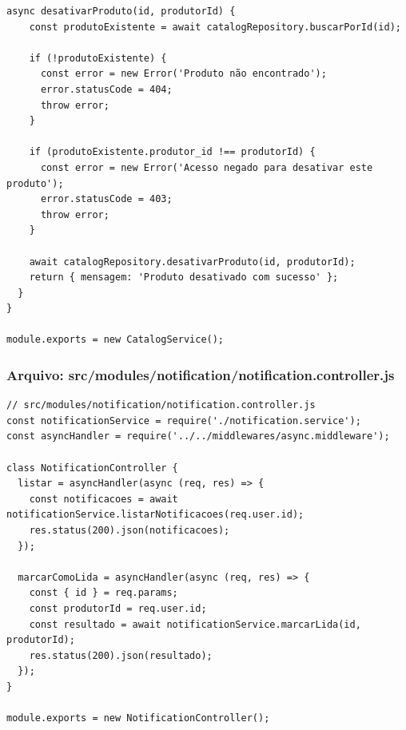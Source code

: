 \begin{lstlisting}[caption={src/modules/catalog/catalog.service.js}]
  async desativarProduto(id, produtorId) {
    const produtoExistente = await catalogRepository.buscarPorId(id);
    
    if (!produtoExistente) {
      const error = new Error('Produto não encontrado');
      error.statusCode = 404;
      throw error;
    }

    if (produtoExistente.produtor_id !== produtorId) {
      const error = new Error('Acesso negado para desativar este produto');
      error.statusCode = 403;
      throw error;
    }

    await catalogRepository.desativarProduto(id, produtorId);
    return { mensagem: 'Produto desativado com sucesso' };
  }
}

module.exports = new CatalogService();\end{lstlisting}
\vspace{0.5cm}
\subsubsection*{Arquivo: src/modules/notification/notification.controller.js}
\begin{lstlisting}[caption={src/modules/notification/notification.controller.js}]
// src/modules/notification/notification.controller.js
const notificationService = require('./notification.service');
const asyncHandler = require('../../middlewares/async.middleware');

class NotificationController {
  listar = asyncHandler(async (req, res) => {
    const notificacoes = await notificationService.listarNotificacoes(req.user.id);
    res.status(200).json(notificacoes);
  });

  marcarComoLida = asyncHandler(async (req, res) => {
    const { id } = req.params;
    const produtorId = req.user.id;
    const resultado = await notificationService.marcarLida(id, produtorId);
    res.status(200).json(resultado);
  });
}

module.exports = new NotificationController();\end{lstlisting}
\vspace{0.5cm}
